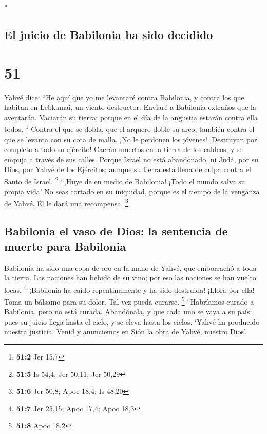 \begin{paracol}{2}
\begin{otherlanguage}{english}
\end{otherlanguage}

\switchcolumn[0]*

\hypertarget{el-juicio-de-babilonia-ha-sido-decidido}{%
\subsection{El juicio de Babilonia ha sido
decidido}\label{el-juicio-de-babilonia-ha-sido-decidido}}

\hypertarget{section-100}{%
\section{51}\label{section-100}}

 Yahvé dice: ``He aquí que yo me levantaré contra
Babilonia, y contra los que habitan en Lebkamai, un viento destructor.
 Enviaré a Babilonia extraños que la aventarán. Vaciarán
su tierra; porque en el día de la angustia estarán contra ella todos.
\footnote{\textbf{51:2} Jer 15,7}  Contra el que se dobla,
que el arquero doble su arco, también contra el que se levanta con su
cota de malla. ¡No le perdonen los jóvenes! ¡Destruyan por completo a
todo su ejército!  Caerán muertos en la tierra de los
caldeos, y se empuja a través de sus calles.  Porque
Israel no está abandonado, ni Judá, por su Dios, por Yahvé de los
Ejércitos; aunque su tierra está llena de culpa contra el Santo de
Israel. \footnote{\textbf{51:5} Is 54,4; Jer 50,11; Jer 50,29}
 ``¡Huye de en medio de Babilonia! ¡Todo el mundo salva su
propia vida! No seas cortado en su iniquidad, porque es el tiempo de la
venganza de Yahvé. Él le dará una recompensa. \footnote{\textbf{51:6}
  Jer 50,8; Apoc 18,4; Is 48,20}

\hypertarget{babilonia-el-vaso-de-dios-la-sentencia-de-muerte-para-babilonia}{%
\subsection{Babilonia el vaso de Dios: la sentencia de muerte para
Babilonia}\label{babilonia-el-vaso-de-dios-la-sentencia-de-muerte-para-babilonia}}

 Babilonia ha sido una copa de oro en la mano de Yahvé,
que emborrachó a toda la tierra. Las naciones han bebido de su vino; por
eso las naciones se han vuelto locas. \footnote{\textbf{51:7} Jer 25,15;
  Apoc 17,4; Apoc 18,3}  ¡Babilonia ha caído
repentinamente y ha sido destruida! ¡Llora por ella! Toma un bálsamo
para su dolor. Tal vez pueda curarse. \footnote{\textbf{51:8} Apoc 18,2}
 ``Habríamos curado a Babilonia, pero no está curada.
Abandónala, y que cada uno se vaya a su país; pues su juicio llega hasta
el cielo, y se eleva hasta los cielos.  `Yahvé ha
producido nuestra justicia. Venid y anunciemos en Sión la obra de Yahvé,
nuestro Dios'.


\end{paracol}

